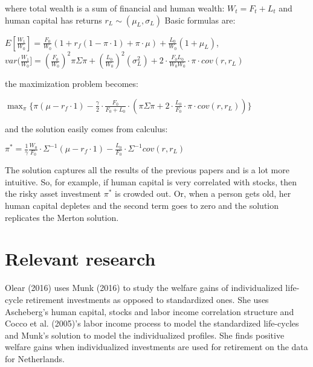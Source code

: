 where total wealth is a sum of financial and human wealth: $W_t = F_t + L_t$ and human capital has returns $r_L \sim (\mu_L, \sigma_L)$ Basic formulas are:

\begin{center}
	$E[\frac{W_1}{W_0}] = \frac{F_0}{W_0} (1 + r_f(1-\pi \cdot 1) + \pi \cdot \mu) + \frac{L_0}{W_0}(1+\mu_L)$,\\
	$var(\frac{W_1}{W_0}] = (\frac{F_0}{W_0})^2 \pi \Sigma \pi + (\frac{L_0}{W_0})^2(\sigma^2_L) + 2 \cdot \frac{F_0 L_0}{W_0 W_0} \cdot \pi\cdot cov(r,r_L)$
\end{center}

the maximization problem becomes:

\begin{center}
	$\displaystyle\max_{\pi} \{ \pi(\mu - r_f \cdot 1) - \frac{\gamma}{2} \cdot \frac{F_0}{F_0+L_0} \cdot (\pi \Sigma \pi + 2 \cdot \frac{L_0}{F_0} \cdot \pi \cdot cov(r,r_L)) \}$
\end{center}

and the solution easily comes from calculus:

\begin{center}
	$\pi^* = \frac{1}{\gamma} \frac{W_0}{F_0} \cdot \Sigma^{-1} (\mu - r_f \cdot 1) - \frac{L_0}{F_0} \cdot \Sigma^{-1} cov(r,r_L)$
\end{center}

The solution captures all the results of the previous papers and is a lot more intuitive. So, for example, if human capital is very correlated with stocks, then the risky asset investment $\pi^*$ is crowded out. Or, when a person gets old, her human capital depletes and the second term goes to zero and the solution replicates the Merton solution.


\section{Relevant research}
Olear (2016) uses Munk (2016) to study the welfare gains of individualized life-cycle retirement investments as opposed to standardized ones. She uses Ascheberg's human capital, stocks and labor income correlation structure and Cocco et al. (2005)'s labor income process to model the standardized life-cycles and Munk's solution to model the individualized profiles. She finds positive welfare gains when individualized investments are used for retirement on the data for Netherlands.
